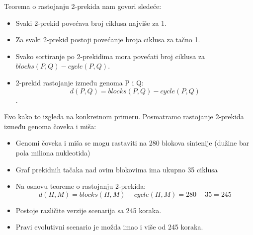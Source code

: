 Teorema o rastojanju 2-prekida nam govori sledeće:
\begin{itemize}
    \item Svaki 2-prekid povećava broj ciklusa najviše za 1.
    \item Za svaki 2-prekid postoji povećanje broja ciklusa za tačno 1.
    \item Svako sortiranje po 2-prekidima mora povećati broj ciklusa za $blocks(P,Q) - cycle(P, Q)$.
    \item 2-prekid rastojanje između genoma P i Q:   $$d(P,Q) = blocks(P, Q) - cycle(P,Q)$$.
\end{itemize}

Evo kako to izgleda na konkretnom primeru. Posmatramo rastojanje 2-prekida između genoma čoveka i miša:
\begin{itemize}
    \item Genomi čoveka i miša se mogu rastaviti na 280 blokova sintenije (dužine bar pola miliona nukleotida)
    \item Graf prekidnih tačaka nad ovim blokovima ima ukupno 35 ciklusa
    \item Na osnovu teoreme o rastojanju 2-prekida:
    $$d(H, M) = blocks(H, M) - cycle(H, M) = 280 - 35 = 245$$
    \item Postoje različite verzije scenarija sa 245 koraka.
    \item Pravi evolutivni scenario je možda imao i više od 245 koraka.
\end{itemize}

%


